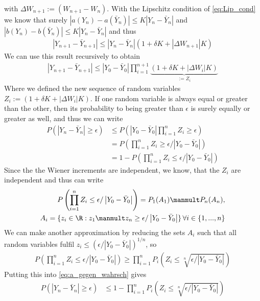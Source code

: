 with $\Delta W_{n+1}:=(W_{n+1}-W_n)$. With the Lipschitz condition of \cref{eq:Lip_cond} we know that surely \mbox{$\left|a(Y_n)-a(\bar{Y}_n)\right|\leq K \left|Y_n-\bar{Y}_{n}\right|$} and \mbox{$\left|b(Y_n)-b(\bar{Y}_n)\right|\leq K \left|Y_n-\bar{Y}_{n}\right|$} and thus
\begin{align}
\left|Y_{n+1}-\bar{Y}_{n+1}\right|\leq \left|Y_n-\bar{Y}_{n}\right|(1+\delta K+|\Delta W_{n+1}|K)
\end{align}
We can use this result recursively to obtain
\begin{align}
\left|Y_{n+1}-\bar{Y}_{n+1}\right|\leq \left|Y_0-\bar{Y}_{0}\right|\prod_{i=1}^{n+1}\underbrace{(1+\delta K+|\Delta W_{i}|K)}_{:=Z_i}
\end{align}
Where we defined the new sequence of random variables $Z_i :=(1+\delta K+|\Delta W_{i}|K) $. If one random variable is always equal or greater than the other, then its probability to being greater than $\epsilon$ is surely equally or greater as well, and thus we can write
\begin{align}
P(\left|Y_{n}-\bar{Y}_{n}\right|\geq \epsilon)&\leq P\left(\left|Y_0-\bar{Y}_0\right|\prod_{i=1}^n Z_i \geq \epsilon\right)\\
& = P\left(\prod_{i=1}^n Z_i \geq \epsilon/\left|Y_0-\bar{Y}_0\right|\right)\\
& = 1 - P\left(\prod_{i=1}^n Z_i \leq \epsilon/\left|Y_0-\bar{Y}_0\right|\right)\label{eq:a_gegen_wahrsch}
\end{align}
Since the the Wiener increments are independent, we know, that the $Z_i$ are independent and thus can write
\begin{align}
P\left(\prod_{i=1}^n Z_i \leq \epsilon/\left|Y_0-\bar{Y}_0\right|\right) = P_1(A_1)\manmult P_n(A_n), \\
A_i = \{z_i\in\R:z_1\manmult z_n \geq \epsilon/\left|Y_0-\bar{Y}_0\right|\}\, \forall i \in \{1,...,n\}
\end{align}
We can make another approximation by reducing the sets $A_i$ such that all random variables fulfil $z_i\leq (\epsilon/\left|Y_0-\bar{Y}_0\right|)^{1/n}$, so 
\begin{align}
P\left(\prod_{i=1}^n Z_i \leq \epsilon/\left|Y_0-\bar{Y}_0\right|\right)  \geq \prod_{i=1}^n P_i\left(Z_i\leq \sqrt[n]{ \epsilon/\left|Y_0-\bar{Y}_0\right|}\right)
\end{align}
Putting this into \cref{eq:a_gegen_wahrsch} gives
\begin{align}
P(\left|Y_{n}-\bar{Y}_{n}\right|\geq \epsilon)&\leq 1 - \prod_{i=1}^n P_i\left(Z_i\leq \sqrt[n]{ \epsilon/\left|Y_0-\bar{Y}_0\right|}\right) \label{eq:a_absch_gegen_wahrsch}
\end{align}
